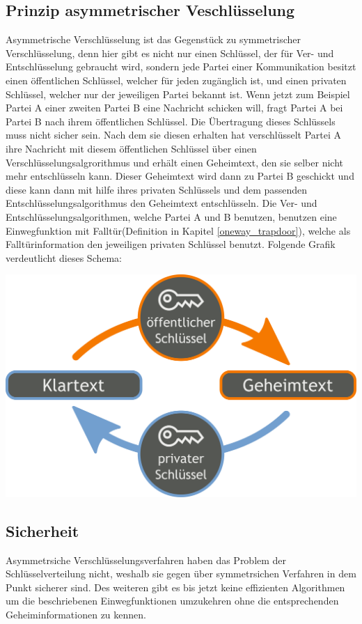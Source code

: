 \documentclass[a4paper,12pt,titlepage]{article}
\begin{document}
\subsection{Prinzip asymmetrischer Veschlüsselung}\label{asymm:prinzip}
Asymmetrische Verschlüsselung ist das Gegenstück zu symmetrischer Verschlüsselung, denn hier gibt es nicht nur einen Schlüssel, der für Ver- und Entschlüsselung gebraucht wird, sondern jede Partei einer Kommunikation besitzt einen öffentlichen Schlüssel, welcher für jeden zugänglich ist, und einen privaten Schlüssel, welcher nur der jeweiligen Partei bekannt ist. Wenn jetzt zum Beispiel Partei A einer zweiten Partei B eine Nachricht schicken will, fragt Partei A bei Partei B nach ihrem öffentlichen Schlüssel. Die Übertragung dieses Schlüssels muss nicht sicher sein. Nach dem sie diesen erhalten hat verschlüsselt Partei A ihre Nachricht mit diesem öffentlichen Schlüssel über einen Verschlüsselungsalgrorithmus und erhält einen Geheimtext, den sie selber nicht mehr entschlüsseln kann. Dieser Geheimtext wird dann zu Partei B geschickt und diese kann dann mit hilfe ihres privaten Schlüssels und dem passenden Entschlüsselungsalgorithmus den Geheimtext entschlüsseln. Die Ver- und Entschlüsselungsalgorithmen, welche Partei A und B benutzen, benutzen eine Einwegfunktion mit Falltür(Definition in Kapitel \ref{oneway_trapdoor}), welche als Falltürinformation den jeweiligen privaten Schlüssel benutzt. \newline
Folgende Grafik verdeutlicht dieses Schema:
\begin{center}
\includegraphics[scale=0.2]{asymm_shema.png} %
\end{center}


\subsection{Sicherheit} %
Asymmetrsiche Verschlüsselungsverfahren haben das Problem der Schlüsselverteilung nicht, weshalb sie gegen über symmetrsichen Verfahren in dem Punkt sicherer sind. Des weiteren gibt es bis jetzt keine effizienten Algorithmen um die beschriebenen Einwegfunktionen umzukehren ohne die entsprechenden Geheiminformationen zu kennen.
\end{document}

